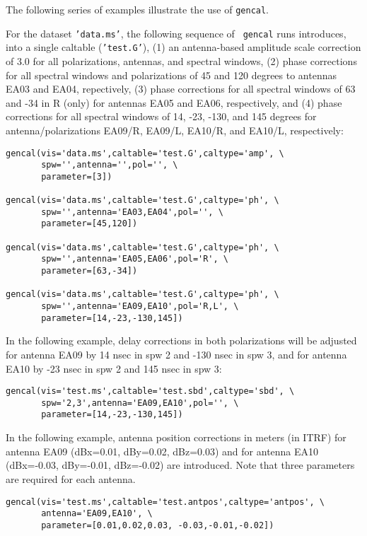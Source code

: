 The following series of examples illustrate the use of {\tt gencal}.

For the dataset {\tt 'data.ms'}, the following sequence of {\tt
gencal} runs introduces, into a single caltable ({\tt 'test.G'}), (1)
an antenna-based amplitude scale correction of $3.0$ for all
polarizations, antennas, and spectral windows, (2) phase corrections
for all spectral windows and polarizations of 45 and 120 degrees to
antennas EA03 and EA04, repectively, (3) phase corrections for all
spectral windows of 63 and -34 in R (only) for antennas EA05 and EA06,
respectively, and (4) phase corrections for all spectral windows of
14, -23, -130, and 145 degrees for antenna/polarizations EA09/R,
EA09/L, EA10/R, and EA10/L, respectively:

\small
\begin{verbatim}
gencal(vis='data.ms',caltable='test.G',caltype='amp', \
       spw='',antenna='',pol='', \
       parameter=[3])

gencal(vis='data.ms',caltable='test.G',caltype='ph', \
       spw='',antenna='EA03,EA04',pol='', \
       parameter=[45,120])

gencal(vis='data.ms',caltable='test.G',caltype='ph', \
       spw='',antenna='EA05,EA06',pol='R', \
       parameter=[63,-34])

gencal(vis='data.ms',caltable='test.G',caltype='ph', \
       spw='',antenna='EA09,EA10',pol='R,L', \
       parameter=[14,-23,-130,145])
\end{verbatim}
\normalsize

In the following example, delay corrections in both polarizations will
be adjusted for antenna EA09 by 14 nsec in spw 2 and -130 nsec in spw
3, and for antenna EA10 by -23 nsec in spw 2 and 145 nsec in spw 3:

\small
\begin{verbatim}
gencal(vis='test.ms',caltable='test.sbd',caltype='sbd', \
       spw='2,3',antenna='EA09,EA10',pol='', \
       parameter=[14,-23,-130,145])
\end{verbatim}
\normalsize

In the following example, antenna position corrections in meters (in
ITRF) for antenna EA09 (dBx=0.01, dBy=0.02, dBz=0.03) and for antenna
EA10 (dBx=-0.03, dBy=-0.01, dBz=-0.02) are introduced.  Note that 
three parameters are required for each antenna. 

\small
\begin{verbatim}
gencal(vis='test.ms',caltable='test.antpos',caltype='antpos', \
       antenna='EA09,EA10', \
       parameter=[0.01,0.02,0.03, -0.03,-0.01,-0.02])
\end{verbatim}
\normalsize



